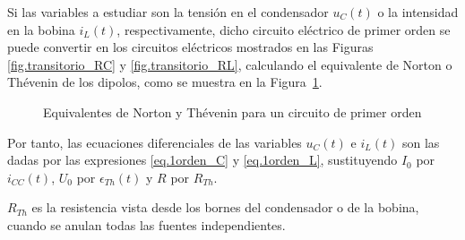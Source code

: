 \documentclass[11pt]{book} %
\numberwithin{dummy}{section}
\theoremstyle{ocrenumbox}
\theoremstyle{blacknumex}
\theoremstyle{blacknumbox}
\theoremstyle{ocrenum}
\newenvironment{remark}{\par\vspace{10pt}\small %
\begin{list}{}{
\leftmargin=35pt %
\rightmargin=25pt}\item\ignorespaces %
\makebox[-2.5pt]{\begin{tikzpicture}[overlay]
\node[draw=ocre!60,line width=1pt,circle,fill=ocre!25,font=\sffamily\bfseries,inner sep=2pt,outer sep=0pt] at (-15pt,0pt){\textcolor{ocre}{N}};\end{tikzpicture}} %
\advance\baselineskip -1pt}{\end{list}\vskip5pt} %
\newlength\esp
\begin{document}
	Si las variables a estudiar son la tensión en el condensador $u_C(t)$ o la intensidad en la bobina $i_L(t)$, respectivamente, dicho circuito eléctrico de primer orden se puede convertir en los circuitos eléctricos mostrados en las Figuras \ref{fig.transitorio_RC} y \ref{fig.transitorio_RL}, calculando el equivalente de Norton o Thévenin de los dipolos, como se muestra en la Figura~\ref{fig.thevenin_1orden}. 
	\begin{figure}[htbp]
	    \centering
	    \hfil
	    \caption{Equivalentes de Norton y Thévenin para un circuito de primer orden}
	    \label{fig.thevenin_1orden}
	\end{figure}
	Por tanto, las ecuaciones diferenciales de las variables $u_C(t)$ e $i_L(t)$ son las dadas por las expresiones \eqref{eq.1orden_C} y \eqref{eq.1orden_L}, sustituyendo $I_0$ por $i_{CC}(t)$, $U_0$ por $\epsilon_{Th}(t)$ y $R$ por $R_{Th}$.
	
	\begin{remark}
	    $R_{Th}$ es la resistencia vista desde los bornes del condensador o de la bobina, cuando se anulan todas las fuentes independientes.
	\end{remark}
	
\end{document}
